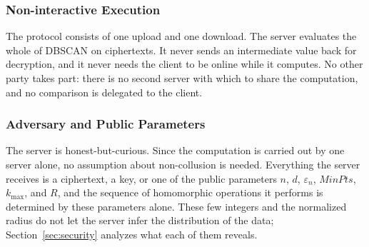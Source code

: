 \subsubsection{Non-interactive Execution}
The protocol consists of one upload and one download. The server
evaluates the whole of DBSCAN on ciphertexts. It never sends an
intermediate value back for decryption, and it never needs the client to
be online while it computes. No other party takes part: there is no
second server with which to share the computation, and no comparison is
delegated to the client.

\subsubsection{Adversary and Public Parameters}
The server is honest-but-curious. Since the computation is carried out by
one server alone, no assumption about non-collusion is needed. Everything
the server receives is a ciphertext, a key, or one of the public
parameters $n$, $d$, $\varepsilon_n$, $\mathit{MinPts}$, $k_{\max}$, and
$R$, and the sequence of homomorphic operations it performs is determined
by these parameters alone. These few integers and the normalized radius
do not let the server infer the distribution of the data;
Section~\ref{sec:security} analyzes what each of them reveals.